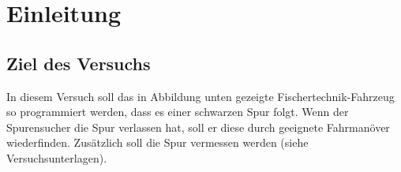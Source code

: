 \documentclass[a4paper, 12pt]{article}
\begin{document}

\section*{Einleitung}
\subsection*{Ziel des Versuchs}
In diesem Versuch soll das in Abbildung unten gezeigte Fischertechnik-Fahrzeug so programmiert werden, dass es einer schwarzen Spur folgt. Wenn der Spurensucher die Spur verlassen hat, soll er diese durch geeignete Fahrmanöver wiederfinden. Zusätzlich soll die Spur vermessen werden (siehe Versuchsunterlagen). 




\begin{figure}[H]
\centering


\end{figure}
\end{document}
